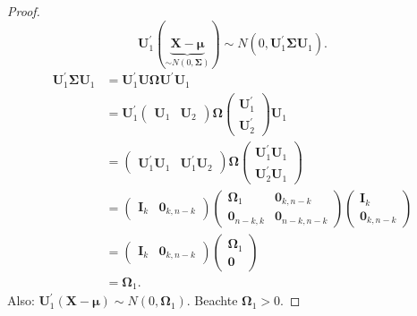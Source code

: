 \documentclass{tstextbook}
\begin{document}
\begin{proof}
	\[
		\mathbf{U}_1^\prime(\underbrace{\mathbf{X}-\boldsymbol{\mu}}_{\sim N(0,\boldsymbol{\Sigma})}) \sim N(0,\mathbf{U}_1^\prime \boldsymbol{\Sigma} \mathbf{U}_1).
	\]
	\[
	\begin{aligned}
	\mathbf{U}_1^\prime \boldsymbol{\Sigma} \mathbf{U}_1 & = \mathbf{U}_1^\prime \mathbf{U} \mathbf{\Omega} \mathbf{U}^\prime \mathbf{U}_1 \\
	& = \mathbf{U}_1^\prime \begin{pmatrix}
		\mathbf{U}_1 & \mathbf{U}_2
		\end{pmatrix} \mathbf{\Omega} \begin{pmatrix}
		\mathbf{U}_1^\prime\\
		\mathbf{U}_2^\prime
		\end{pmatrix} \mathbf{U}_1 \\
	& = \begin{pmatrix}
		\mathbf{U}_1^\prime \mathbf{U}_1 & \mathbf{U}_1^\prime \mathbf{U}_2
	\end{pmatrix} \mathbf{\Omega} \begin{pmatrix}
		\mathbf{U}_1^\prime \mathbf{U}_1\\
		\mathbf{U}_2^\prime \mathbf{U}_1
	\end{pmatrix} \\
	& = \begin{pmatrix}
		\mathbf{I}_k & \boldsymbol{0}_{k,n-k}
		\end{pmatrix}  
		\begin{pmatrix}
			\mathbf{\Omega}_1 		& \boldsymbol{0}_{k,n-k} \\
			\boldsymbol{0}_{n-k,k}		& \boldsymbol{0}_{n-k,n-k}
		\end{pmatrix} 
		\begin{pmatrix}
			\mathbf{I}_k\\
			\boldsymbol{0}_{k,n-k}
		\end{pmatrix} \\
	& = \begin{pmatrix}
		\mathbf{I}_k & \boldsymbol{0}_{k,n-k}
	\end{pmatrix}  
	\begin{pmatrix}
		\mathbf{\Omega}_1  \\
		\boldsymbol{0}
	\end{pmatrix} \\
	& = \mathbf{\Omega}_1.
	\end{aligned}
	\]
	Also: $ \mathbf{U}_1^\prime (\mathbf{X}-\boldsymbol{\mu}) \sim N(0,\mathbf{\Omega}_1). $ Beachte $ \mathbf{\Omega}_1 > 0. $
	

\end{proof}
\end{document}
